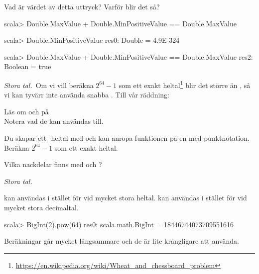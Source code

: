\Subtask Vad är värdet av detta uttryck? Varför blir det så?
\begin{REPL}
scala> Double.MaxValue + Double.MinPositiveValue == Double.MaxValue
\end{REPL}

\SOLUTION

\TaskSolved \what

\SubtaskSolved 

\begin{REPL}
scala> Double.MinPositiveValue
res0: Double = 4.9E-324
\end{REPL}

\SubtaskSolved 

\begin{REPL}
scala> Double.MaxValue + Double.MinPositiveValue == Double.MaxValue
res2: Boolean = true
\end{REPL}

\QUESTEND




\def\what{\emph{Stora tal.}}

\QUESTBEGIN

\Task \what~Om vi vill beräkna $2^{64} -1$ som ett exakt heltal\footnote{\url{https://en.wikipedia.org/wiki/Wheat_and_chessboard_problem}} blir det större än , så vi kan tyvärr inte använda snabba . Till vår räddning:  

\Subtask Läs om  och  på \Scaladoc \\ Notera vad de kan användas till. 

\Subtask Du skapar ett -heltal med  och kan anropa funktionen  på en  med punktnotation. Beräkna $2^{64} -1$ som ett exakt heltal.

\Subtask Vilka nackdelar finns med  och ?

\SOLUTION

\TaskSolved \what

\SubtaskSolved {} kan användas i stället för  vid mycket stora heltal.  kan användas i stället för  vid mycket stora decimaltal.

\SubtaskSolved 
\begin{REPL}
scala> BigInt(2).pow(64)
res0: scala.math.BigInt = 18446744073709551616
\end{REPL}

\SubtaskSolved Beräkningar går mycket långsammare och de är lite krångligare att använda.

